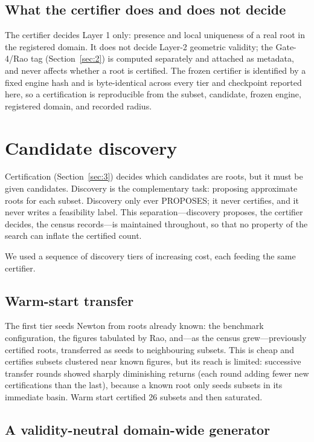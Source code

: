 \documentclass[pdflatex,sn-mathphys-num]{sn-jnl}
\begin{document}
\subsection{What the certifier does and does not decide}\label{sec:3.5}

The certifier decides Layer 1 only: presence and local uniqueness of a real root in the registered domain. It does not decide Layer-2 geometric validity; the Gate-4/Rao tag (Section~\ref{sec:2}) is computed separately and attached as metadata, and never affects whether a root is certified. The frozen certifier is
identified by a fixed engine hash and is byte-identical across every tier and checkpoint reported here, so a certification is reproducible from the subset, candidate, frozen engine, registered domain, and recorded radius.



\section{Candidate discovery}\label{sec:4}

Certification (Section~\ref{sec:3}) decides which candidates are roots, but it must be given candidates. Discovery is the complementary task: proposing approximate roots for each subset. Discovery only ever PROPOSES; it never certifies, and it never writes a feasibility label. This separation---discovery
proposes, the certifier decides, the census records---is maintained throughout, so that no property of the search can inflate the certified count.

We used a sequence of discovery tiers of increasing cost, each feeding the same certifier.

\subsection{Warm-start transfer}\label{sec:4.1}

The first tier seeds Newton from roots already known: the benchmark configuration, the figures tabulated by Rao, and---as the census grew---previously certified roots, transferred as seeds to neighbouring subsets. This is cheap and certifies subsets clustered near known figures, but its reach
is limited: successive transfer rounds showed sharply diminishing returns (each round adding fewer new certifications than the last), because a known root only seeds subsets in its immediate basin. Warm start certified 26 subsets and then saturated.

\subsection{A validity-neutral domain-wide generator}\label{sec:4.2}
\end{document}
